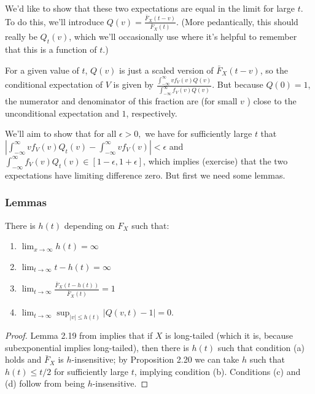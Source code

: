 \documentclass[../main.tex]{subfiles}
\begin{document}
We'd like to show that these two expectations are equal in the limit for large \(t\). To do this, we'll introduce \(Q(v)=\frac{\bar{F}_X(t-v)}{\bar{F}_X(t)}\). (More pedantically, this should really be \(Q_t(v)\), which we'll occasionally use where it's helpful to remember that this is a function of \(t\).)

For a given value of \(t\), \(Q(v)\) is just a scaled version of \(\bar{F}_X(t-v)\), so the conditional expectation of \(V\) is given by \(\frac{\int_{-\infty}^\infty vf_V(v)Q(v)} {\int_{-\infty}^\infty f_V(v)Q(v)}\). But because \(Q(0)=1\), the numerator and denominator of this fraction are (for small \(v\) ) close to the unconditional expectation and \(1\), respectively.

We'll aim to show that for all \(\epsilon>0,\) we have for sufficiently large \(t\) that \(\left|\int_{-\infty}^\infty vf_V(v)Q_t(v) - \int_{-\infty}^\infty vf_V(v)\right|<\epsilon\) and \(\int_{-\infty}^\infty f_V(v)Q_t(v) \in [1-\epsilon,1+\epsilon]\), which implies (exercise) that the two expectations have limiting difference zero. But first we need some lemmas.

\subsubsection{Lemmas}

\begin{lemma}
 There is \(h(t)\) depending on \(F_X\) such that:
\begin{enumerate}[label=(\alph*)]
    \item \(\lim_{x\to\infty} h(t)=\infty\)
    \item \(\lim_{t \to\infty} t - h(t) = \infty\)
    \item \(\lim_{t\to\infty}\frac{\bar F_X(t-h(t))}{\bar F_X(t)}=1\)
    \item \(\lim_{t \to \infty} \sup_{|v| \le h(t)} |Q(v,t)-1| = 0\).
\end{enumerate}
\end{lemma}

\begin{proof}
 Lemma 2.19 from \citep{foss2013introduction} implies that if \(X\) is long-tailed (which it is, because subexponential implies long-tailed), then there is \(h(t)\) such that condition (a) holds and \(\bar F_X\) is \(h\)-insensitive; by Proposition 2.20 we can take \(h\) such that \(h(t) \le t/2\) for sufficiently large \(t\), implying condition (b). Conditions (c) and (d) follow from being \(h\)-insensitive.
 \end{proof}
\end{document}
